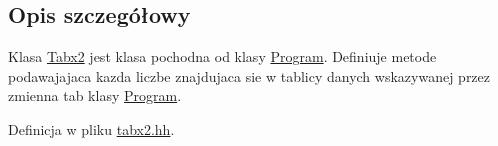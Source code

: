 \subsection{Opis szczegółowy}
Klasa \hyperlink{class_tabx2}{Tabx2} jest klasa pochodna od klasy \hyperlink{class_program}{Program}. Definiuje metode podawajajaca kazda liczbe znajdujaca sie w tablicy danych wskazywanej przez zmienna tab klasy \hyperlink{class_program}{Program}. 

Definicja w pliku \hyperlink{tabx2_8hh_source}{tabx2.\-hh}.

